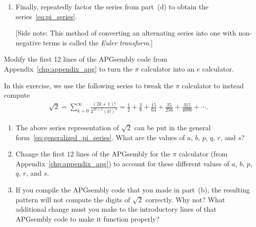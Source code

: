 \begin{multicols}{2}
\begin{problemstar}
\begin{enumerate}[label=\bf\color{ocre}(\alph*)]
		\item Finally, repeatedly factor the series from part~(d) to obtain the series~\eqref{eq:pi_series}.
		
		[Side note: This method of converting an alternating series into one with non-negative terms is called the \emph{Euler transform}.]
	\end{enumerate}
\end{problemstar}


\mfilbreak


\begin{problemstar}\label{exer:universal_computation_e_calc}
	Modify the first 12 lines of the APGsembly code from Appendix~\ref{chp:appendix_apg} to turn the $\pi$ calculator into an $e$ calculator.
	
\end{problemstar}


\mfilbreak


\begin{problem}\label{exer:universal_computation_sqrt2_calc}
	In this exercise, we use the following series to tweak the $\pi$ calculator to instead compute
	\begin{align*}
		\sqrt{2} = \sum_{k=0}^\infty \frac{(2k+1)!}{2^{3k+1}(k!)^2 } = \frac{1}{2} +\frac{3}{8} + \frac{15}{64} + \frac{35}{256} + \frac{315}{4096} + \cdots.
	\end{align*}
	
	\begin{enumerate}[label=\bf\color{ocre}(\alph*)]
		\item The above series representation of $\sqrt{2}$ can be put in the general form~\eqref{eq:generalized_pi_series}. What are the values of $a$, $b$, $p$, $q$, $r$, and $s$?
		
		\item Change the first $12$ lines of the APGsembly for the $\pi$ calculator (from Appendix~\ref{chp:appendix_apg}) to account for these different values of $a$, $b$, $p$, $q$, $r$, and $s$.
		
		\item If you compile the APGsembly code that you made in part~(b), the resulting pattern will not compute the digits of $\sqrt{2}$ correctly. Why not? What additional change must you make to the introductory lines of that APGsembly code to make it function properly?
	\end{enumerate}
\end{problem}



\end{multicols}
